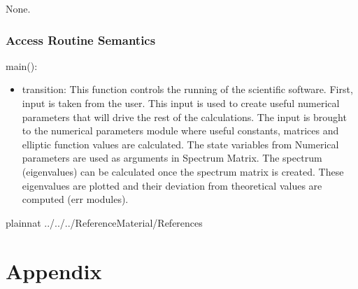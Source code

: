 \documentclass[12pt, titlepage]{article}
\begin{document}
None.

\subsubsection{Access Routine Semantics}

\noindent main():
\begin{itemize}
	\item transition: This function controls the running of the scientific 
	software. First, input is taken from the user. This input is used to create 
	useful numerical parameters that will drive the rest of the calculations. 
	The input is brought to the numerical parameters module where useful 
	constants, matrices and elliptic function values are calculated. The state 
	variables from Numerical parameters are used as arguments in Spectrum 
	Matrix. The spectrum (eigenvalues) can be calculated once the spectrum 
	matrix is created. These eigenvalues are plotted and their deviation from 
	theoretical values are computed (err modules). 
\end{itemize}

\newpage 


 {plainnat}
 {../../../ReferenceMaterial/References}

\newpage

\section{Appendix} \label{Appendix}

\end{document}
